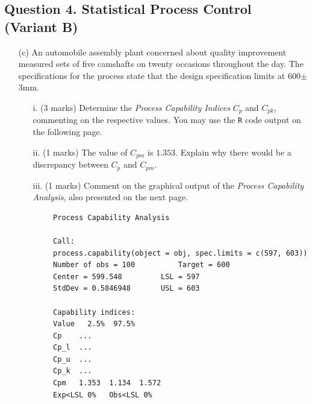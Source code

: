\documentclass[a4paper,12pt]{article}
\begin{document}
\newpage
\subsection*{Question 4. Statistical Process Control (Variant B) }




\begin{itemize}
	\item[(c)] An automobile assembly plant concerned about quality improvement measured sets of five camshafts on twenty occasions throughout the day. The specifications for the process state that the design specification limits at 600$\pm$3mm.
	
	
	\begin{itemize}
		\item[i.] (3 marks) Determine the \emph{Process Capability Indices} $C_p$ and $C_{pk}$, commenting on the respective values. You may use the \texttt{R} code output on the following page.
		\item[ii.] (1 marks)  The value of $C_{pm}$ is $1.353$. Explain why there would be a discrepancy between $C_p$ and $C_{pm}$.
		\item[iii.] (1 marks) Comment on the graphical output of the \emph{Process Capability Analysis}, also presented on the next page.
	\end{itemize}
	
	
	\newpage
	\begin{framed}
		\begin{verbatim}
		Process Capability Analysis
		
		Call:
		process.capability(object = obj, spec.limits = c(597, 603))
		Number of obs = 100          Target = 600
		Center = 599.548         LSL = 597
		StdDev = 0.5846948       USL = 603
		
		Capability indices:
		Value   2.5%  97.5%
		Cp    ...
		Cp_l  ...
		Cp_u  ...
		Cp_k  ...
		Cpm   1.353  1.134  1.572
		Exp<LSL 0%   Obs<LSL 0%
		\end{verbatim}
	\end{framed}
	
	
	

\end{itemize}
\end{document}

